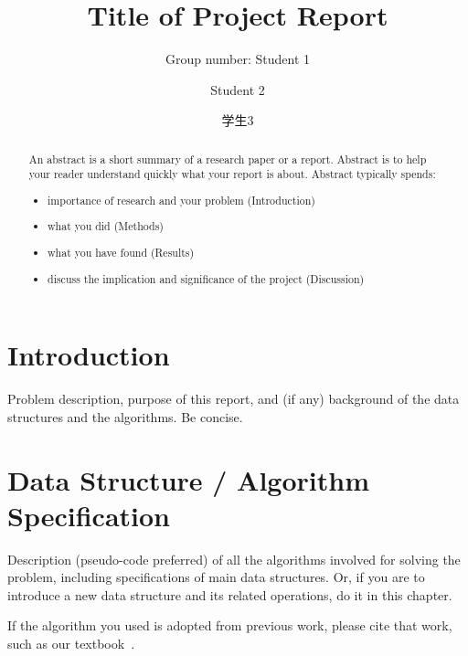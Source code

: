 \documentclass[twoside]{article}
\begin{document}
\begin{CJK*}{UTF8}{gbsn}
\title{Title of Project Report}
\author{Group number: Student 1 \and Student 2 \and 学生3}
\maketitle

\begin{abstract}
An abstract is a short summary of a research paper or a report.
Abstract is to help your reader understand quickly what your report is about.
Abstract typically spends:
\begin{itemize}
    \item importance of research and your problem (Introduction)
    \item what you did (Methods)
    \item what you have found (Results)
    \item discuss the implication and significance of the project (Discussion)
\end{itemize}
\end{abstract}

\section{Introduction}

Problem description, purpose of this report, and (if any) background of the data structures and the algorithms.  Be concise.

\section{Data Structure / Algorithm Specification}

Description (pseudo-code preferred) of all the algorithms involved for solving the problem,  
including specifications of main data structures.
Or, if you are to introduce a new data structure and its related operations, do it in this chapter.

If the algorithm you used is adopted from previous work, please cite that work, such as our textbook~\cite{10.5555/1614191}. 


\end{CJK*}
\end{document}
